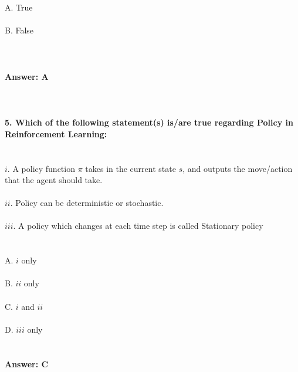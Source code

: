 \documentclass[prl,twocolumn,showpacs,preprintnumbers,superscriptaddress]{revtex4}
\theoremstyle{plain}
\theoremstyle{definition}
\begin{document}
\begin{widetext}
\\
\\
A. True
\\
\\
B. False
\\
\\
\\
\\
\textbf{Answer: A}
\\
\\
\\
\\
\textbf{5. Which of the following statement(s) is/are true regarding Policy in Reinforcement Learning:}
\\
\\
\\
$i$. A policy function $\pi$ takes in the current state $s$, and
outputs the move/action that the agent should take.
\\
\\
$ii$. Policy can be deterministic or stochastic.
\\
\\
$iii$. A policy which changes at each time step is called Stationary policy
\\
\\
\\
A. $i$ only
\\
\\
B. $ii$ only
\\
\\
C. $i$ and $ii$
\\
\\
D. $iii$ only
\\
\\
\\
\textbf{Answer: C}
\\
\\
\\
\\
\\
\\
\\
\\
\\
\end{widetext}
\end{document}
